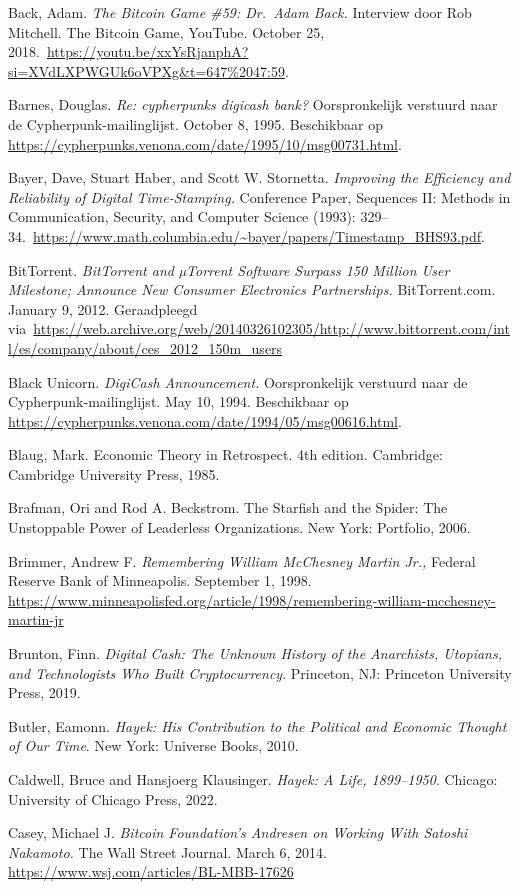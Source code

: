 \documentclass[
  a5paper,
  smalldemyvopaper,11pt,twoside,onecolumn,openright,extrafontsizes,
hidelinks]{memoir}
\begin{document}
{Back, Adam. \emph{The Bitcoin Game \#59: Dr.~Adam Back.} Interview door
Rob Mitchell. The Bitcoin Game, YouTube. October 25,
2018.~\url{https://youtu.be/xxYsRjanphA?si=XVdLXPWGUk6oVPXg&t=647\%2047:59}.

Barnes, Douglas. \emph{Re: cypherpunks digicash bank?} Oorspronkelijk
verstuurd naar de Cypherpunk-mailinglijst. October 8, 1995. Beschikbaar
op \url{https://cypherpunks.venona.com/date/1995/10/msg00731.html}.

Bayer, Dave, Stuart Haber, and Scott W. Stornetta. \emph{Improving the
Efficiency and Reliability of Digital Time-Stamping.} Conference Paper,
Sequences II: Methods in Communication, Security, and Computer Science
(1993):
329--34.~\url{https://www.math.columbia.edu/~bayer/papers/Timestamp_BHS93.pdf}.

BitTorrent. \emph{BitTorrent and µTorrent Software Surpass 150 Million
User Milestone; Announce New Consumer Electronics Partnerships.}
BitTorrent.com. January 9, 2012. Geraadpleegd
via~\url{https://web.archive.org/web/20140326102305/http://www.bittorrent.com/intl/es/company/about/ces_2012_150m_users}

Black Unicorn. \emph{DigiCash Announcement.} Oorspronkelijk verstuurd
naar de Cypherpunk-mailinglijst. May 10, 1994. Beschikbaar op
\url{https://cypherpunks.venona.com/date/1994/05/msg00616.html}.

Blaug, Mark. Economic Theory in Retrospect. 4th edition. Cambridge:
Cambridge University Press, 1985.

Brafman, Ori and Rod A. Beckstrom. The Starfish and the Spider: The
Unstoppable Power of Leaderless Organizations. New York: Portfolio,
2006.

Brimmer, Andrew F. \emph{Remembering William McChesney Martin Jr.,}
Federal Reserve Bank of Minneapolis. September 1, 1998.
\url{https://www.minneapolisfed.org/article/1998/remembering-william-mcchesney-martin-jr}

Brunton, Finn. \emph{Digital Cash: The Unknown History of the
Anarchists, Utopians, and Technologists Who Built Cryptocurrency}.
Princeton, NJ: Princeton University Press, 2019.

Butler, Eamonn. \emph{Hayek: His Contribution to the Political and
Economic Thought of Our Time}. New York: Universe Books, 2010.

Caldwell, Bruce and Hansjoerg Klausinger. \emph{Hayek: A Life,
1899--1950}. Chicago: University of Chicago Press, 2022.

Casey, Michael J. \emph{Bitcoin Foundation's Andresen on Working With
Satoshi Nakamoto.} The Wall Street Journal. March 6, 2014.
\url{https://www.wsj.com/articles/BL-MBB-17626}

}
\end{document}
